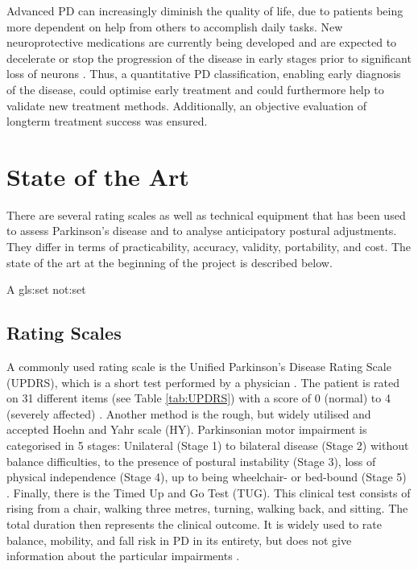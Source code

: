 Advanced \gls{PD} can increasingly diminish the quality of life, due to patients being more dependent on help from others to accomplish daily tasks. New neuroprotective medications are currently being developed and are expected to decelerate or stop the progression of the disease in early stages prior to significant loss of neurons \cite{botzel_motivation_2014}\cite{mancini_isway:_2012}. Thus, a quantitative PD classification, enabling early diagnosis of the disease, could optimise early treatment and could furthermore help to validate new treatment methods. Additionally, an objective evaluation of longterm treatment success was ensured.


\section{State of the Art}

There are several rating scales as well as technical equipment that has been used to assess Parkinson's disease and to analyse anticipatory postural adjustments.  They differ in terms of practicability, accuracy, validity, portability, and cost. The state of the art at the beginning of the project is described below.

A \gls{gls:set} \gls{not:set}

\subsection{Rating Scales}

A commonly used rating scale is the Unified Parkinson’s Disease Rating Scale (UPDRS), which is a short test performed by a physician \cite{klerk_long-term_2009}. The patient is rated on 31 different items (see Table \ref{tab:UPDRS}) with a score of 0 (normal) to 4 (severely affected) \cite{herndon_handbook_2006}. Another method is the rough, but widely utilised and accepted Hoehn and Yahr scale (HY). Parkinsonian motor impairment is categorised in 5 stages: Unilateral (Stage 1) to bilateral disease (Stage 2) without balance difficulties, to the presence of postural instability (Stage 3), loss of physical independence (Stage 4), up to being wheelchair- or bed-bound (Stage 5) \cite{goetz_movement_2004}. Finally, there is the Timed Up and Go Test (TUG). This clinical test consists of rising from a chair, walking three metres, turning, walking back, and sitting. The total duration then represents the clinical outcome. It is widely used to rate balance, mobility, and fall risk in PD in its entirety, but does not give information about the particular impairments \cite{palmerini_quantification_2013}.

